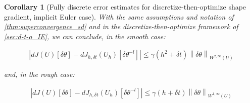\documentclass[english,a4paper,9pt,oneside]{scrbook}	%
\theoremstyle{break}
\newtheorem{cor}[equation]{Corollary}
\theoremstyle{remark}
\newcommand{\norm}[1]{\left\lVert#1\right\rVert}
\newcommand{\te}{\theta}
\begin{document}
\begin{cor}[Fully discrete error estimates for discretize-then-optimize shape gradient, implicit Euler case]
\label{cor:superconvergence_sd_fd_IE}
With the same assumptions and notation of \cref{thm:superconvergence_sd} and in the discretize-then-optimize framework of \cref{sec:d-t-o_IE}, we can conclude, in the smooth case:

\begin{align*}
	\left |dJ(U)[\delta \te] - dJ_{h,\delta t}(U_h)[\delta \te^{-l}] \right|\leq \gamma  (h^2 + \delta t)\norm{\delta \te}_{W^{2,\infty}(U)}
\end{align*}

and, in the rough case:

\begin{align*}
	\left |dJ(U)[\delta \te] - dJ_{h,\delta t}(U_h)[\delta \te^{-l}] \right|\leq \gamma  (h + \delta t)\norm{\delta \te}_{W^{1,\infty}(U)}
\end{align*}

\end{cor}
\end{document}
